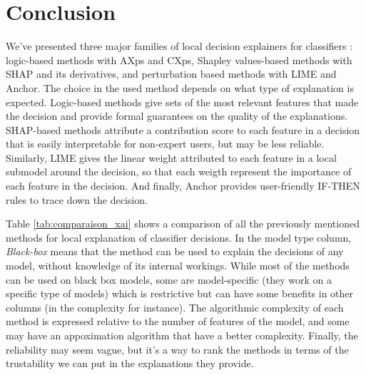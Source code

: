 
\section{Conclusion}

We've presented three major families of local decision explainers for classifiers : logic-based methods with AXps and CXps, Shapley values-based methods with SHAP and its derivatives, and perturbation based methods with LIME and Anchor. The choice in the used method depends on what type of explanation is expected. Logic-based methods give sets of the most relevant features that made the decision and provide formal guarantees on the quality of the explanations. SHAP-based methods attribute a contribution score to each feature in a decision that is easily interpretable for non-expert users, but may be less reliable. Similarly, LIME gives the linear weight attributed to each feature in a local submodel around the decision, so that each weigth represent the importance of each feature in the decision. And finally, Anchor provides user-friendly IF-THEN rules to trace down the decision.

Table \ref{tab:comparaison_xai} shows a comparison of all the previously mentioned methods for local explanation of classifier decisions. In the model type column, \textit{Black-box} means that the method can be used to explain the decisions of any model, without knowledge of its internal workings. While most of the methods can be used on black box models, some are model-specific (they work on a specific type of models) which is restrictive but can have some benefits in other columns (in the complexity for instance). The algorithmic complexity of each method is expressed relative to the number of features of the model, and some may have an appoximation algorithm that have a better complexity. Finally, the reliability may seem vague, but it's a way to rank the methods in terms of the trustability we can put in the explanations they provide.

